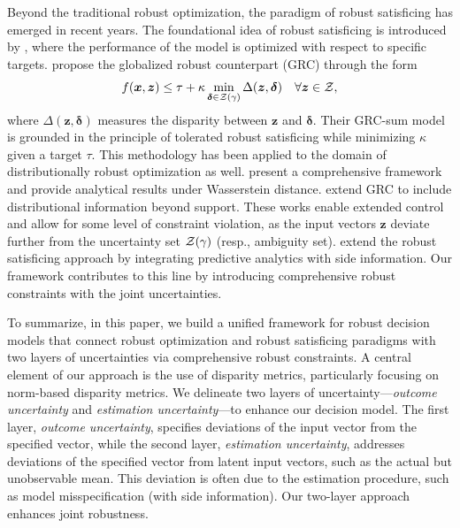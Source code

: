 \documentclass[mnsc, nonblindrev]{informswp}
\newcommand{\1}[1]{\mathds{1}{\left(#1\right)}}
\begin{document}
Beyond the traditional robust optimization, the paradigm of robust satisficing has emerged in recent years. The foundational idea of robust satisficing is introduced by \cite{Brown_Sim_2009}, where the performance of the model is optimized with respect to specific targets. \cite{BenTal_et_al_2017globalized} propose the globalized robust counterpart (GRC) through the form
$$
f(\bm x, \bm z) \leq \tau + \kappa \min_{\bm \delta \in \mathcal{Z}(\gamma)} \Delta(\bm z, \bm \delta) ~~~\forall \bm z \in \mathcal{Z},
$$
where $\Delta(\bm z, \bm \delta)$ measures the disparity between $\bm z$ and $\bm \delta$. Their GRC-sum model is grounded in the principle of tolerated robust satisficing while minimizing $\kappa$ given a target $\tau$. This methodology has been applied to the domain of distributionally robust optimization as well. \cite{Long_Sim_Zhou_2023robust} present a comprehensive framework and provide analytical results under Wasserstein distance. \cite{liu2023globalized} extend GRC to include distributional information beyond support. These works enable extended control and allow for some level of constraint violation, as the input vectors $\bm z$ deviate further from the uncertainty set $\mathcal{Z}(\gamma)$ (resp., ambiguity set). \cite{sim2024analytics} extend the robust satisficing approach by integrating predictive analytics with side information. Our framework contributes to this line by introducing comprehensive robust constraints with the joint uncertainties.

To summarize, in this paper, we build a unified framework for robust decision models that connect robust optimization and robust satisficing paradigms with two layers of uncertainties via comprehensive robust constraints. A central element of our approach is the use of disparity metrics, particularly focusing on norm-based disparity metrics. We delineate two layers of uncertainty---\emph{outcome uncertainty} and \emph{estimation uncertainty}---to enhance our decision model. The first layer, \emph{outcome uncertainty}, specifies deviations of the input vector from the specified vector, while the second layer, \emph{estimation uncertainty}, addresses deviations of the specified vector from latent input vectors, such as the actual but unobservable mean. This deviation is often due to the estimation procedure, such as model misspecification (with side information). Our two-layer approach enhances joint robustness.
\end{document}
